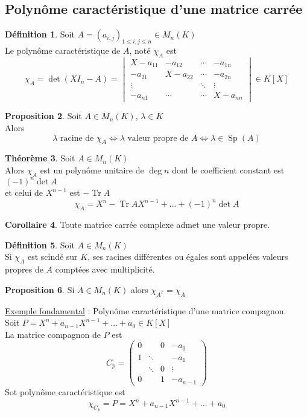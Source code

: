 \documentclass[10pt,a4paper]{article}
\theoremstyle{definition}
\newtheorem{proposition}{Proposition}[section]
\newtheorem{theorem}[proposition]{Théorème}
\newtheorem{corollaire}[proposition]{Corollaire}
\newtheorem{definition}[proposition]{Définition}
\DeclareMathOperator{\Sp}{Sp}
\DeclareMathOperator{\Tr}{Tr}
\begin{document}
\subsection{Polynôme caractéristique d'une matrice carrée}
\begin{definition}
Soit $A = (a_{i, j})_{1 \leq i, j \leq n} \in M_n(K)$ \\
Le polynôme caractéristique de $A$, noté $\chi_A$ est 
\[ \chi_A = \det(XI_n - A) = \begin{vmatrix}
X - a_{11} & -a_{12} & \cdots & -a_{1n} \\
-a_{21} & X - a_{22} & \cdots & -a_{2n} \\
\vdots & & \ddots & \vdots \\
-a_{n1} & \cdots & \cdots & X - a_{nn}
\end{vmatrix}  \in K[X] \]
\end{definition}
\begin{proposition}
Soit $A \in M_n(K)$, $\lambda \in K$ \\
Alors
\[ \lambda \text{ racine de } \chi_A \iff \lambda \text{ valeur propre de } A \iff \lambda \in \Sp(A) \]
\end{proposition}
\begin{theorem}
Soit $A \in M_n(K)$ \\
Alors $\chi_A$ est un polynôme unitaire de $\deg n$ dont le coefficient constant est $(-1)^n \det A$\\
 et celui de $X^{n - 1}$ est $- \Tr A$
 \[ \chi_A = X^n - \Tr A X^{n - 1} + ... + (-1)^n \det A \]
\end{theorem}
\begin{corollaire}
Toute matrice carrée complexe admet une valeur propre.
\end{corollaire}
\begin{definition}
Soit $A \in M_n(K)$ \\
Si $\chi_A$ est scindé sur $K$, ses racines différentes ou égales sont appelées valeurs propres de $A$ comptées avec multiplicité.
\end{definition}
\begin{proposition}
Si $A \in M_n(K)$ alors $\chi_{A^T} = \chi_A$
\end{proposition}
\noindent \uline{Exemple fondamental} : Polynôme caractéristique d'une matrice compagnon. \\
Soit $P = X^n + a_{n - 1} X^{n - 1} + ... + a_0 \in K[X]$ \\
La matrice compagnon de $P$ est
\[ C_p = \begin{pmatrix}
0 & & 0 & -a_0 \\
1 & \ddots & & -a_1 \\
 & \ddots & 0 & \vdots \\
0 & & 1 & -a_{n - 1}
\end{pmatrix} \]
Sot polynôme caractéristique est
\[ \chi_{C_p} = P = X^n + a_{n - 1} X^{n - 1} + ... + a_0 \]
\end{document}
